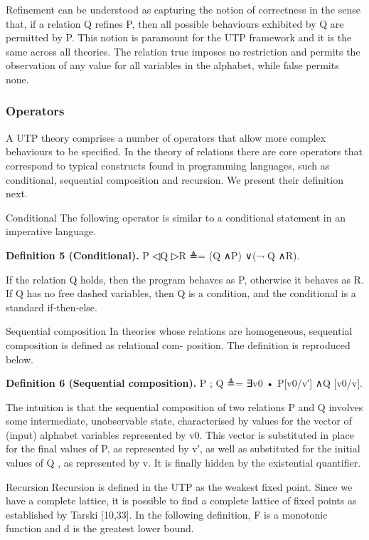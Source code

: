 \documentclass[11pt]{article}
\begin{document}
Refinement can be understood as capturing the notion of correctness in the sense that, if a relation Q refines P, then all possible behaviours exhibited by Q are permitted by P. This notion is paramount for the UTP framework and it is the same across all theories. The relation true imposes no restriction and permits the observation of any value for all variables in the alphabet, while false permits none.

\subsubsection{Operators}
A UTP theory comprises a number of operators that allow more complex behaviours to be specified. In the theory of relations there are core operators that correspond to typical constructs found in programming languages, such as conditional, sequential composition and recursion. We present their definition next.

Conditional The following operator is similar to a conditional statement in an imperative language.

\noindent\textbf{Definition 5 (Conditional).} P ◁Q ▷R ≜= (Q ∧P) ∨(¬ Q ∧R).


If the relation Q holds, then the program behaves as P, otherwise it behaves as R. If Q has no free dashed variables, then Q is a condition, and the conditional is a standard if-then-else.

Sequential composition In theories whose relations are homogeneous, sequential composition is defined as relational com- position. The definition is reproduced below.

\noindent\textbf{Definition 6 (Sequential composition).} P ; Q ≜= ∃v0 • P[v0/v′] ∧Q [v0/v].


The intuition is that the sequential composition of two relations P and Q involves some intermediate, unobservable state, characterised by values for the vector of (input) alphabet variables represented by v0. This vector is substituted in place for the final values of P, as represented by v′, as well as substituted for the initial values of Q , as represented by v. It is finally hidden by the existential quantifier.

Recursion Recursion is defined in the UTP as the weakest fixed point. Since we have a complete lattice, it is possible to find a complete lattice of fixed points as established by Tarski [10,33]. In the following definition, F is a monotonic function and d is the greatest lower bound.
\end{document}
